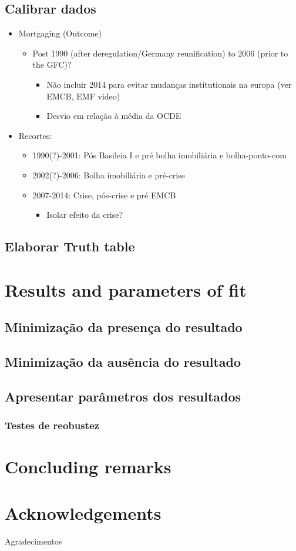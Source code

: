 \documentclass{SelfArx}
\begin{document}
\subsection*{Calibrar dados}
\label{sec:org0281a0b}
\begin{itemize}
\item Mortgaging (Outcome)
\begin{itemize}
\item Post 1990 (after deregulation/Germany reunification) to 2006 (prior to the GFC)?
\begin{itemize}
\item Não incluir 2014 para evitar mudanças institutionais na europa (ver EMCB, EMF video)
\item Desvio em relação à média da OCDE
\end{itemize}
\end{itemize}
\item Recortes:
\begin{itemize}
\item 1990(?)-2001: Pós Basileia I e pré bolha imobiliária e bolha-ponto-com
\item 2002(?)-2006: Bolha imobiliária e pré-crise
\item 2007-2014: Crise, pós-crise e pré EMCB
\begin{itemize}
\item Isolar efeito da crise?
\end{itemize}
\end{itemize}
\end{itemize}


\subsection*{Elaborar Truth table}
\label{sec:org319796a}
\section*{Results and parameters of fit}
\label{sec:orgd9578b0}
\subsection*{Minimização da presença do resultado}
\label{sec:org5239b39}
\subsection*{Minimização da ausência do resultado}
\label{sec:orgf68f65d}
\subsection*{Apresentar parâmetros dos resultados}
\label{sec:org170d93b}
\subsubsection*{Testes de reobustez}
\label{sec:orgd2ea7d2}

\section*{Concluding remarks}
\label{sec:org642db22}

\section*{Acknowledgements}
\label{sec:org4eb6e38}

Agradecimentos


\printbibliography
\end{document}
